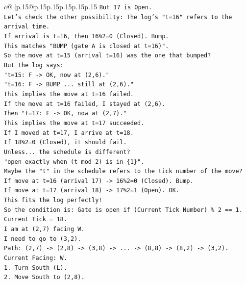 \documentclass{article}
\begin{document}
{\begin{supertabular}{c@{$\;$}|p{.15\linewidth}@{}p{.15\linewidth}p{.15\linewidth}p{.15\linewidth}p{.15\linewidth}p{.15\linewidth}}
{{{\texttt{But 17 is Open.} \\
\texttt{Let's check the other possibility: The log's "t=16" refers to the arrival time.} \\
\texttt{If arrival is t=16, then 16\%2=0 (Closed). Bump.} \\
\texttt{This matches "BUMP (gate A is closed at t=16)".} \\
\texttt{So the move at t=15 (arrival t=16) was the one that bumped?} \\
\texttt{But the log says:} \\
\texttt{"t=15: F {-}> OK, now at (2,6)."} \\
\texttt{"t=16: F {-}> BUMP ... still at (2,6)."} \\
\texttt{This implies the move at t=16 failed.} \\
\texttt{If the move at t=16 failed, I stayed at (2,6).} \\
\texttt{Then "t=17: F {-}> OK, now at (2,7)."} \\
\texttt{This implies the move at t=17 succeeded.} \\
\texttt{If I moved at t=17, I arrive at t=18.} \\
\texttt{If 18\%2=0 (Closed), it should fail.} \\
\texttt{Unless... the schedule is different?} \\
\texttt{"open exactly when (t mod 2) is in \{1\}".} \\
\texttt{Maybe the "t" in the schedule refers to the tick number of the move?} \\
\texttt{If move at t=16 (arrival 17) {-}> 16\%2=0 (Closed). Bump.} \\
\texttt{If move at t=17 (arrival 18) {-}> 17\%2=1 (Open). OK.} \\
\texttt{This fits the log perfectly!} \\
\texttt{So the condition is: Gate is open if (Current Tick Number) \% 2 == 1.} \\
\texttt{Current Tick = 18.} \\
\texttt{I am at (2,7) facing W.} \\
\texttt{I need to go to (3,2).} \\
\texttt{Path: (2,7) {-}> (2,8) {-}> (3,8) {-}> ... {-}> (8,8) {-}> (8,2) {-}> (3,2).} \\
\texttt{Current Facing: W.} \\
\texttt{1. Turn South (L).} \\
\texttt{2. Move South to (2,8).} \\
}}}
\end{supertabular}}
\end{document}
